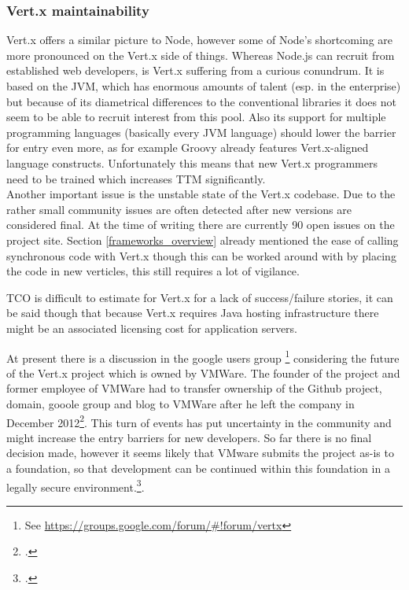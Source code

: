 \subsubsection{Vert.x maintainability}
Vert.x offers a similar picture to Node, however some of Node's shortcoming are
more pronounced on the Vert.x side of things. Whereas Node.js can recruit from
established web developers, is Vert.x suffering from a curious conundrum. It is
based on the JVM, which has enormous amounts of talent (esp. in the enterprise)
but because of its diametrical differences to the conventional libraries it does
not seem to be able to recruit interest from this pool. Also its support for
multiple programming languages (basically every JVM language) should lower the
barrier for entry even more, as for example Groovy already features
Vert.x-aligned language constructs. Unfortunately this means that new Vert.x
programmers need to be trained which increases TTM significantly.\\
Another important issue is the unstable state of the Vert.x codebase. Due to the
rather small community issues are often detected after new versions are considered final.
At the time of writing there are currently 90 open issues on the project site.
Section \ref{frameworks_overview} already mentioned the ease of calling synchronous code with Vert.x though this
can be worked around with by placing the code in new verticles, this still
requires a lot of vigilance.

TCO is difficult to estimate for Vert.x for a lack of success/failure stories,
it can be said though that because Vert.x requires Java hosting infrastructure
there might be an associated licensing cost for application servers.

At present there is a discussion in the google users group
\footnote{See \url{https://groups.google.com/forum/\#!forum/vertx}} considering the future of
the Vert.x project which is owned by VMWare. The founder of the project and
former employee of VMWare had to transfer ownership of the Github project,
domain, gooole group and blog to VMWare after he left the company in December
2012\footcite[Cf.][]{Vertx_announcement_2013}. This turn of events has put
uncertainty in the community and might increase the entry barriers for new
developers. So far there is no final decision made, however it seems likely that VMware
submits the project as-is to a foundation, so that development can be continued
within this foundation in a legally secure environment.\footcite[Cf.][]{Vertx_future_2013}.

